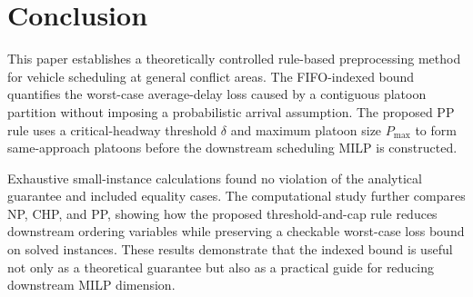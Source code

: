 \section{Conclusion}
\label{sec:conclusion}

This paper establishes a theoretically controlled rule-based preprocessing method for vehicle scheduling at general conflict areas. The FIFO-indexed bound quantifies the worst-case average-delay loss caused by a contiguous platoon partition without imposing a probabilistic arrival assumption. The proposed PP rule uses a critical-headway threshold \(\delta\) and maximum platoon size \(P_{\max}\) to form same-approach platoons before the downstream scheduling MILP is constructed.

Exhaustive small-instance calculations found no violation of the analytical guarantee and included equality cases. The computational study further compares NP, CHP, and PP, showing how the proposed threshold-and-cap rule reduces downstream ordering variables while preserving a checkable worst-case loss bound on solved instances. These results demonstrate that the indexed bound is useful not only as a theoretical guarantee but also as a practical guide for reducing downstream MILP dimension.
